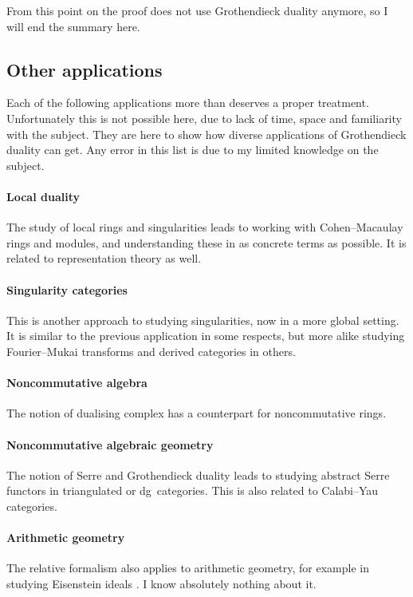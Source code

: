 \documentclass[10pt,a4paper]{article}
\begin{document}
From this point on the proof does not use Grothendieck duality anymore, so I will end the summary here.


\subsection{Other applications}
Each of the following applications more than deserves a proper treatment. Unfortunately this is not possible here, due to lack of time, space and familiarity with the subject. They are here to show how diverse applications of Grothendieck duality can get. Any error in this list is due to my limited knowledge on the subject.

\paragraph{Local duality}
The study of local rings and singularities leads to working with Cohen--Macaulay rings and modules, and understanding these in as concrete terms as possible. It is related to representation theory as well.

\paragraph{Singularity categories}
This is another approach to studying singularities, now in a more global setting. It is similar to the previous application in some respects, but more alike studying Fourier--Mukai transforms and derived categories in others.

\paragraph{Noncommutative algebra}
The notion of dualising complex has a counterpart for noncommutative rings.

\paragraph{Noncommutative algebraic geometry}
The notion of Serre and Grothendieck duality leads to studying abstract Serre functors in triangulated or dg~categories. This is also related to Calabi--Yau categories.

\paragraph{Arithmetic geometry}
The relative formalism also applies to arithmetic geometry, for example in studying Eisenstein ideals \cite{mazur-modular-curves-eisenstein-ideal}. I know absolutely nothing about it.
\end{document}

